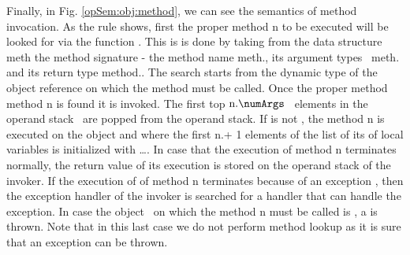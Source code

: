        Finally, in Fig. \ref{opSem:obj:method}, we can see the semantics of method invocation. 
       As the rule shows, first the proper method \mbox{\rm n} to be executed will be looked for via the function \lookupOnly. 
       This is is done by taking from the data structure  \mbox{\rm meth} the method signature - the method name \mbox{\rm  meth}.\methodName, 
       its argument types \ \mbox{\rm meth}.\args{}  and its  return type \mbox{\rm method}.\retType. 
       The search starts from the dynamic type of the object reference on which the method must be called.
       Once  the proper method method \mbox{\rm n} is found it is invoked.
	 The first top $\mbox{\rm n}.\numArgs$ \ elements in the operand stack \stackOnly \ are popped from the operand stack. If 
          is not \Mynull, the  method   \mbox{\rm n}  is executed on the object    
	 and where the first \mbox{\rm n}.\numArgs + 1 elements of the list of its of local variables is initialized with 
          \ldots \stackOnlyParam{\counterOnly}. In case that the execution of method \mbox{\rm n}
	 terminates normally, the return value \Res{}  of its execution is stored on the operand stack of the invoker. 
	 If the execution of of method \mbox{\rm n} terminates because of an exception \Exc, then the exception handler of the invoker is searched for
	 a handler that can handle the exception. In case the object   \  on which the  method \mbox{\rm n} must be 
	 called is \Mynull, a \NullPointerExc{} is thrown. Note that in this last case we do not perform method lookup as it is sure that an exception can be thrown.  			


